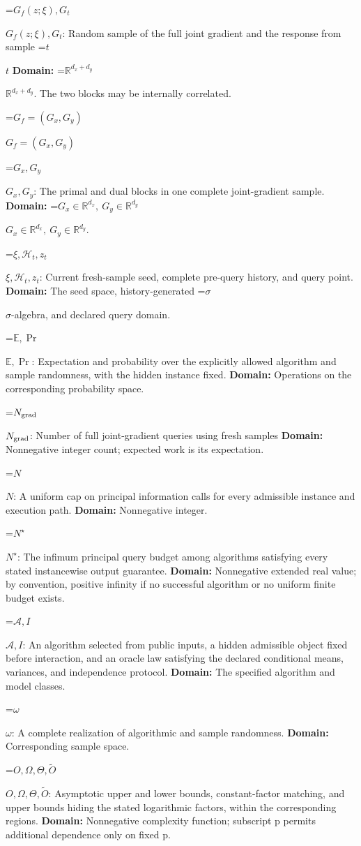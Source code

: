 \documentclass[10pt,a4paper]{article}
\newcommand{\AtlasMath}[1]{\par\begingroup\centering\setbox0=\hbox{$\displaystyle #1$}\ifdim\wd0>1.4\linewidth\typeout{ATLAS WIDE FORMULA: \the\wd0}\fi\ifdim\wd0>\linewidth\resizebox{\linewidth}{!}{\box0}\else\box0\fi\par\endgroup}
\newcommand{\AtlasInlineMath}[1]{\begingroup\setbox0=\hbox{$#1$}\ifdim\wd0>.4\linewidth\endgroup\AtlasMath{#1}\else\endgroup$#1$\fi}
\begin{document}
\AtlasInlineMath{G_f(z;\xi),G_t}: Random sample of the full joint gradient and the response from sample \AtlasInlineMath{t} \textbf{Domain:} \AtlasInlineMath{\mathbb R^{d_x+d_y}}. The two blocks may be internally correlated.

\AtlasInlineMath{G_f=(G_x,G_y)}

\AtlasInlineMath{G_x,G_y}: The primal and dual blocks in one complete joint-gradient sample. \textbf{Domain:} \AtlasInlineMath{G_x\in\mathbb R^{d_x},\ G_y\in\mathbb R^{d_y}}.

\AtlasInlineMath{\xi,\mathcal H_t,z_t}: Current fresh-sample seed, complete pre-query history, and query point. \textbf{Domain:} The seed space, history-generated \AtlasInlineMath{\sigma}-algebra, and declared query domain.

\AtlasInlineMath{\mathbb E,\Pr}: Expectation and probability over the explicitly allowed algorithm and sample randomness, with the hidden instance fixed. \textbf{Domain:} Operations on the corresponding probability space.

\AtlasInlineMath{N_{\rm grad}}: Number of full joint-gradient queries using fresh samples \textbf{Domain:} Nonnegative integer count; expected work is its expectation.

\AtlasInlineMath{N}: A uniform cap on principal information calls for every admissible instance and execution path. \textbf{Domain:} Nonnegative integer.

\AtlasInlineMath{N^\star}: The infimum principal query budget among algorithms satisfying every stated instancewise output guarantee. \textbf{Domain:} Nonnegative extended real value; by convention, positive infinity if no successful algorithm or no uniform finite budget exists.

\AtlasInlineMath{\mathcal A,I}: An algorithm selected from public inputs, a hidden admissible object fixed before interaction, and an oracle law satisfying the declared conditional means, variances, and independence protocol. \textbf{Domain:} The specified algorithm and model classes.

\AtlasInlineMath{\omega}: A complete realization of algorithmic and sample randomness. \textbf{Domain:} Corresponding sample space.

\AtlasInlineMath{O,\Omega,\Theta,\widetilde O}: Asymptotic upper and lower bounds, constant-factor matching, and upper bounds hiding the stated logarithmic factors, within the corresponding regions. \textbf{Domain:} Nonnegative complexity function; subscript p permits additional dependence only on fixed p.
\end{document}
